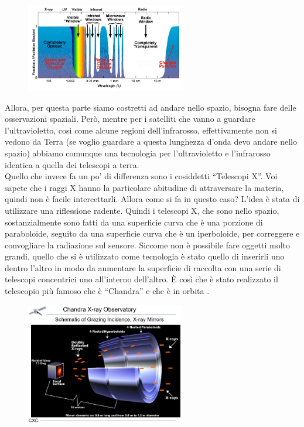 \documentclass[a4paper,11pt]{article}
\begin{document}
\begin{figure}[h!!]
        \centering
        \includegraphics[width=7cm]{35.jpg}
        \label{}
    \end{figure}

Allora, per questa parte siamo costretti ad andare nello spazio, bisogna fare delle osservazioni spaziali. Però, mentre per i satelliti che vanno a guardare l’ultravioletto, così come alcune regioni dell’infrarosso, effettivamente non si vedono da Terra (se voglio guardare a questa lunghezza d’onda devo andare nello spazio) abbiamo comunque una tecnologia per l’ultravioletto e l’infrarosso identica a quella dei telescopi a terra.\\ 

Quello che invece fa un po’ di differenza sono i cosiddetti “Telescopi X”. Voi sapete che i raggi X hanno la particolare abitudine di attraversare la materia, quindi non è facile intercettarli. Allora come si fa in questo caso? L’idea è stata di utilizzare una riflessione radente. Quindi i telescopi X, che sono nello spazio, sostanzialmente sono fatti da una superficie curva che è una porzione di paraboloide, seguito da una superficie curva che è un iperboloide, per correggere e convogliare la radiazione sul sensore. Siccome non è possibile fare oggetti molto grandi, quello che si è utilizzato come tecnologia è stato quello di inserirli uno dentro l’altro in modo da aumentare la superficie di raccolta con una serie di telescopi concentrici uno all’interno dell’altro. È così che è stato realizzato il telescopio più famoso che è “Chandra” e che è in orbita . 

\begin{figure}[h!!]
        \centering
        \includegraphics[width=7cm]{36.jpg}
        \label{}
    \end{figure}
\end{document}
